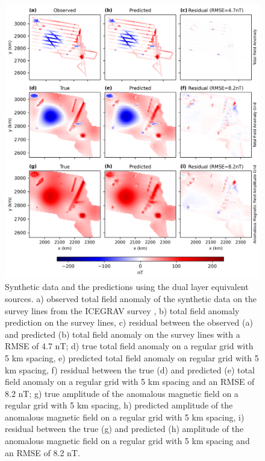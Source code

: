 \begin{figure}[tb!]
\centering
\includegraphics[width=1\linewidth]{figures/dual_layer_synthetic.png}
\caption{
    Synthetic data and the predictions using the dual layer equivalent sources. a) observed total field anomaly of the synthetic data on the survey lines from the ICEGRAV survey \citep{ICEGRAV_data}, b) total field anomaly prediction on the survey lines, c) residual between the observed (a) and predicted (b) total field anomaly on the survey lines with a RMSE of 4.7 nT; d) true total field anomaly on a regular grid with 5 km spacing, e) predicted total field anomaly on regular grid with 5 km spacing, f) residual between the true (d) and predicted (e) total field anomaly on a regular grid with 5 km spacing and an RMSE of 8.2 nT; g) true amplitude of the anomalous magnetic field on a regular grid with 5 km spacing, h) predicted amplitude of the anomalous magnetic field on a regular grid with 5 km spacing, i) residual between the true (g) and predicted (h) amplitude of the anomalous magnetic field on a regular grid with 5 km spacing and an RMSE of 8.2 nT.
}
\label{fig:dual_layer_synthetic}
\end{figure}


